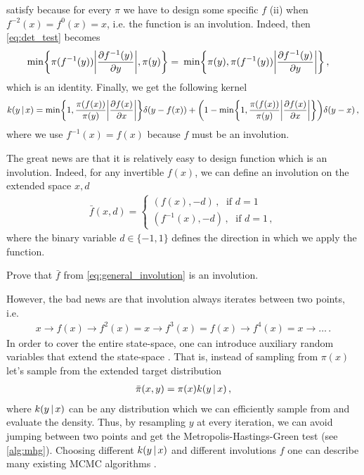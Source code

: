 satisfy because for every $\pi$ we have to design some specific $f$ (ii) when $f^{-2}(x) = f^0(x) = x$, i.e. the function is an involution. Indeed, then \cref{eq:det_test} becomes
\begin{align}
    \min\left\{\pi(f^{-1}(y))\bigg|\deriv{f^{-1}(y)}{y}\bigg|, \pi(y)\right\} =~& \min\left\{\pi(y), \pi(f^{-1}(y))\bigg|\deriv{f^{-1}(y)}{y}\bigg|\right\}\,,
\end{align}
which is an identity. Finally, we get the following kernel
\begin{align}
    k(y\cond x) = \min\left\{1, \frac{\pi(f(x))}{\pi(y)}\bigg|\deriv{f(x)}{x}\bigg|\right\}\delta(y-f(x)) + \left(1-\min\left\{1, \frac{\pi(f(x))}{\pi(y)}\bigg|\deriv{f(x)}{x}\bigg|\right\}\right)\delta(y-x)\,,
\end{align}
where we use $f^{-1}(x) = f(x)$ because $f$ must be an involution.

The great news are that it is relatively easy to design function which is an involution. Indeed, for any invertible $f(x)$, we can define an involution on the extended space $x,d$
\begin{align}
    \bar{f}(x,d) = 
    \begin{cases}
        (f(x), -d)\,, \;\text{ if } d=1\\
        (f^{-1}(x), -d)\,, \;\text{ if } d=1\,,
    \end{cases}
    \label{eq:general_involution}
\end{align}
where the binary variable $d\in\{-1,1\}$ defines the direction in which we apply the function. 
\begin{exercise}
    Prove that $\bar{f}$ from \cref{eq:general_involution} is an involution.
\end{exercise}

However, the bad news are that involution always iterates between two points, i.e.
\begin{align}
    x \to f(x) \to f^2(x) = x \to f^3(x) = f(x) \to f^4(x) = x \to \ldots\,.
\end{align}
In order to cover the entire state-space, one can introduce auxiliary random variables that extend the state-space . That is, instead of sampling from $\pi(x)$ let's sample from the extended target distribution
\begin{align}
    \bar{\pi}(x,y) = \pi(x)k(y\,|\, x)\,,
\end{align}
where $k(y\,|\, x)$ can be any distribution which we can efficiently sample from and evaluate the density. Thus, by resampling $y$ at every iteration, we can avoid jumping between two points and get the Metropolis-Hastings-Green test (see \cref{alg:mhg}). Choosing different $k(y\,|\, x)$ and different involutions $f$ one can describe many existing MCMC algorithms \citep{neklyudov2020involutive}.

